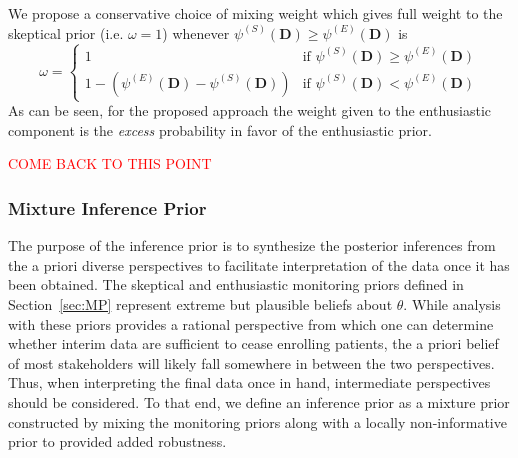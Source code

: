 \documentclass[useAMS,usenatbib,referee]{biom}
\begin{document}
We propose a conservative choice of mixing weight which gives full weight to the skeptical prior (i.e. $\omega=1$) whenever $\psi^{(S)}(\mathbf{D})\geq \psi^{(E)}(\mathbf{D})$ is
\begin{equation}\label{eq:adaptive_prior}
\omega=\begin{cases} 
      1 & \text{if } \psi^{(S)}(\mathbf{D})\geq \psi^{(E)}(\mathbf{D}) \\
      1-(\psi^{(E)}(\mathbf{D})-\psi^{(S)}(\mathbf{D})) &\text{if } \psi^{(S)}(\mathbf{D})< \psi^{(E)}(\mathbf{D})
   \end{cases}
\end{equation}
%
As can be seen, for the proposed approach the weight given to the enthusiastic component is the \textit{excess} probability in favor of the enthusiastic prior.
%




%

%



\textcolor{red}{COME BACK TO THIS POINT}
\subsubsection{Mixture Inference Prior}
The purpose of the inference prior is to synthesize the posterior inferences from the a priori diverse perspectives to facilitate interpretation of the data once it has been obtained. The skeptical and enthusiastic monitoring priors defined in Section~\ref{sec:MP} represent extreme but plausible beliefs about $\theta$.
%
While analysis with these priors provides a rational perspective from which one can determine whether interim data are sufficient 
to cease enrolling patients, the a priori belief of most stakeholders will likely fall somewhere in between the two perspectives.
%
Thus, when interpreting the final data once in hand, intermediate perspectives should be considered.
%
To that end, we define an inference prior as a mixture prior constructed by mixing the monitoring priors along with a locally non-informative prior to provided added robustness.
\end{document}
